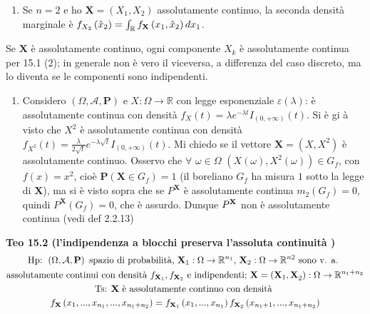 \documentclass{article}
\begin{document}
\begin{enumerate}
\item Se $n=2$ e ho $\mathbf{X}=\left( X_{1},X_{2}\right) $ assolutamente
continuo, la seconda densit\`{a} marginale \`{e} $f_{X_{2}}\left( \hat{x}%
_{2}\right) =\int_{%
\mathbb{R}
}f_{\mathbf{X}}\left( x_{1},\hat{x}_{2}\right) dx_{1}$.
\end{enumerate}

Se $\mathbf{X}$ \`{e} assolutamente continuo, ogni componente $X_{k}$ \`{e}
assolutamente continua per 15.1 (2); in generale non \`{e} vero il
viceversa, a differenza del caso discreto, ma lo diventa se le componenti
sono indipendenti.

\begin{enumerate}
\item Considero $\left( \Omega ,\mathcal{A},\mathbf{P}\right) $ e $X:\Omega
\rightarrow 
\mathbb{R}
$ con legge esponenziale $\varepsilon \left( \lambda \right) $: \`{e}
assolutamente continua con densit\`{a} $f_{X}\left( t\right) =\lambda
e^{-\lambda t}I_{\left( 0,+\infty \right) }\left( t\right) $. Si \`{e} gi%
\`{a} visto che $X^{2}$ \`{e} assolutamente continua con densit\`{a} $%
f_{X^{2}}\left( t\right) =\frac{\lambda }{2\sqrt{t}}e^{-\lambda \sqrt{t}%
}I_{\left( 0,+\infty \right) }\left( t\right) $. Mi chiedo se il vettore $%
\mathbf{X}=\left( X,X^{2}\right) $ \`{e} assolutamente continuo. Osservo che 
$\forall $ $\omega \in \Omega $ $\left( X\left( \omega \right) ,X^{2}\left(
\omega \right) \right) \in G_{f}$, con $f\left( x\right) =x^{2}$, cio\`{e} $%
\mathbf{P}\left( \mathbf{X}\in G_{f}\right) =1$ (il boreliano $G_{f}$ ha
misura $1$ sotto la legge di $\mathbf{X}$), ma si \`{e} visto sopra che se $%
P^{\mathbf{X}}$ \`{e} assolutamente continua $m_{2}\left( G_{f}\right) =0$,
quindi $P^{\mathbf{X}}\left( G_{f}\right) =0$, che \`{e} assurdo. Dunque $P^{%
\mathbf{X}}$ non \`{e} assolutamente continua (vedi def 2.2.13)
\end{enumerate}

\textbf{Teo 15.2 (l'indipendenza a blocchi preserva l'assoluta continuit\`{a}%
)}%
\begin{gather*}
\text{Hp: }\left( \Omega ,\mathcal{A},\mathbf{P}\right) \text{ spazio di
probabilit\`{a}, }\mathbf{X}_{1}:\Omega \rightarrow 
\mathbb{R}
^{n_{1}}\text{, }\mathbf{X}_{2}:\Omega \rightarrow 
\mathbb{R}
^{n2}\text{ sono v. a. } \\
\text{assolutamente continui con densit\`{a} }f_{\mathbf{X}_{1}},f_{\mathbf{X%
}_{2}}\text{ e indipendenti; }\mathbf{X}=\left( \mathbf{X}_{1}\mathbf{,X}%
_{2}\right) :\Omega \rightarrow 
\mathbb{R}
^{n_{1}+n_{2}} \\
\text{Ts: }\mathbf{X}\text{ \`{e} assolutamente continuo con densit\`{a} } \\
f_{\mathbf{X}}\left( x_{1},...,x_{n_{1}},...,x_{n_{1}+n_{2}}\right) =f_{%
\mathbf{X}_{1}}\left( x_{1},...,x_{n_{1}}\right) f_{\mathbf{X}_{2}}\left(
x_{n_{1}+1},...,x_{n_{1}+n_{2}}\right)
\end{gather*}
\end{document}
